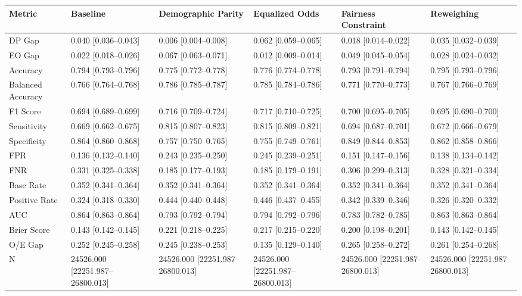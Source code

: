 \begin{tabular}{llllll}
\toprule
Metric & Baseline & Demographic Parity & Equalized Odds & Fairness Constraint & Reweighing \\
\midrule
DP Gap & 0.040 [0.036--0.043] & 0.006 [0.004--0.008] & 0.062 [0.059--0.065] & 0.018 [0.014--0.022] & 0.035 [0.032--0.039] \\
EO Gap & 0.022 [0.018--0.026] & 0.067 [0.063--0.071] & 0.012 [0.009--0.014] & 0.049 [0.045--0.054] & 0.028 [0.024--0.032] \\
Accuracy & 0.794 [0.793--0.796] & 0.775 [0.772--0.778] & 0.776 [0.774--0.778] & 0.793 [0.791--0.794] & 0.795 [0.793--0.796] \\
Balanced Accuracy & 0.766 [0.764--0.768] & 0.786 [0.785--0.787] & 0.785 [0.784--0.786] & 0.771 [0.770--0.773] & 0.767 [0.766--0.769] \\
F1 Score & 0.694 [0.689--0.699] & 0.716 [0.709--0.724] & 0.717 [0.710--0.725] & 0.700 [0.695--0.705] & 0.695 [0.690--0.700] \\
Sensitivity & 0.669 [0.662--0.675] & 0.815 [0.807--0.823] & 0.815 [0.809--0.821] & 0.694 [0.687--0.701] & 0.672 [0.666--0.679] \\
Specificity & 0.864 [0.860--0.868] & 0.757 [0.750--0.765] & 0.755 [0.749--0.761] & 0.849 [0.844--0.853] & 0.862 [0.858--0.866] \\
FPR & 0.136 [0.132--0.140] & 0.243 [0.235--0.250] & 0.245 [0.239--0.251] & 0.151 [0.147--0.156] & 0.138 [0.134--0.142] \\
FNR & 0.331 [0.325--0.338] & 0.185 [0.177--0.193] & 0.185 [0.179--0.191] & 0.306 [0.299--0.313] & 0.328 [0.321--0.334] \\
Base Rate & 0.352 [0.341--0.364] & 0.352 [0.341--0.364] & 0.352 [0.341--0.364] & 0.352 [0.341--0.364] & 0.352 [0.341--0.364] \\
Positive Rate & 0.324 [0.318--0.330] & 0.444 [0.440--0.448] & 0.446 [0.437--0.455] & 0.342 [0.339--0.346] & 0.326 [0.320--0.332] \\
AUC & 0.864 [0.863--0.864] & 0.793 [0.792--0.794] & 0.794 [0.792--0.796] & 0.783 [0.782--0.785] & 0.863 [0.863--0.864] \\
Brier Score & 0.143 [0.142--0.145] & 0.221 [0.218--0.225] & 0.217 [0.215--0.220] & 0.200 [0.198--0.201] & 0.143 [0.142--0.145] \\
O/E Gap & 0.252 [0.245--0.258] & 0.245 [0.238--0.253] & 0.135 [0.129--0.140] & 0.265 [0.258--0.272] & 0.261 [0.254--0.268] \\
N & 24526.000 [22251.987--26800.013] & 24526.000 [22251.987--26800.013] & 24526.000 [22251.987--26800.013] & 24526.000 [22251.987--26800.013] & 24526.000 [22251.987--26800.013] \\

\end{tabular}

